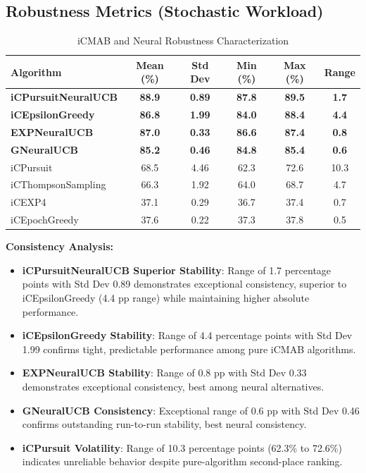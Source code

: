 \documentclass[12pt,a4paper]{article}
\newcommand{\success}[1]{\textcolor{accentgreen}{\textbf{#1}}}
\newcommand{\warning}[1]{\textcolor{warningred}{\textbf{#1}}}
\newcommand{\legacy}[1]{\textcolor{legacycolor}{\textbf{#1}}}
\newcommand{\neural}[1]{\textcolor{neuralcolor}{\textbf{#1}}}
\begin{document}
\subsection{Robustness Metrics (Stochastic Workload)}

\begin{table}[H]
\centering
\caption{iCMAB and Neural Robustness Characterization}
\label{tab:robustness}
\begin{tabular}{@{}lccccc@{}}\toprule
\textbf{Algorithm} & \textbf{Mean (\%)} & \textbf{Std Dev} & \textbf{Min (\%)} & \textbf{Max (\%)} & \textbf{Range} \\\midrule
\neural{iCPursuitNeuralUCB}   & \neural{88.9} & \neural{0.89} & \neural{87.8} & \neural{89.5} & \neural{1.7} \\
\success{iCEpsilonGreedy}   & \success{86.8} & \success{1.99} & \success{84.0} & \success{88.4} & \success{4.4} \\
\legacy{EXPNeuralUCB}       & \legacy{87.0} & \legacy{0.33} & \legacy{86.6} & \legacy{87.4} & \legacy{0.8} \\
\neural{GNeuralUCB}        & \neural{85.2} & \neural{0.46} & \neural{84.8} & \neural{85.4} & \neural{0.6} \\
iCPursuit                   & 68.5 & 4.46 & 62.3 & 72.6 & 10.3 \\
iCThompsonSampling          & 66.3 & 1.92 & 64.0 & 68.7 & 4.7 \\
iCEXP4                      & 37.1 & 0.29 & 36.7 & 37.4 & 0.7 \\
iCEpochGreedy               & 37.6 & 0.22 & 37.3 & 37.8 & 0.5 \\\bottomrule
\end{tabular}
\end{table}

\textbf{Consistency Analysis:}
\begin{itemize}
\item \neural{iCPursuitNeuralUCB Superior Stability}: Range of 1.7 percentage points with Std Dev 0.89 demonstrates exceptional consistency, superior to iCEpsilonGreedy (4.4 pp range) while maintaining higher absolute performance.
\item \success{iCEpsilonGreedy Stability}: Range of 4.4 percentage points with Std Dev 1.99 confirms tight, predictable performance among pure iCMAB algorithms.
\item \legacy{EXPNeuralUCB Stability}: Range of 0.8 pp with Std Dev 0.33 demonstrates exceptional consistency, best among neural alternatives.
\item \neural{GNeuralUCB Consistency}: Exceptional range of 0.6 pp with Std Dev 0.46 confirms outstanding run-to-run stability, best neural consistency.
\item \warning{iCPursuit Volatility}: Range of 10.3 percentage points (62.3\% to 72.6\%) indicates unreliable behavior despite pure-algorithm second-place ranking.
\end{itemize}
\end{document}
